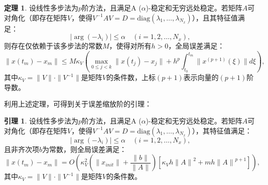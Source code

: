 \documentclass{article}
\theoremstyle{definition}
\newtheorem{theorem}{定理}
\newtheorem{lemma}{引理}
\begin{document}
\begin{theorem}
设线性多步法为\(p\)阶方法，且满足A (\(\alpha \))-稳定和无穷远处稳定。若矩阵\(A\)可对角化（即存在矩阵\(V\)，使得\(V^{-1} A V = D = \text{diag}(\lambda_1, \dots, \lambda_{N_x})\)），且其特征值满足：
\[
|\arg(-\lambda_i)| \leq \alpha\quad (i=1,2,\dots,N_x), 
\]
则存在仅依赖于该多步法的常数\(M\)，使得对所有\(h > 0\)，全局误差满足：
\[
\|x(t_m) - x_m\| \leq M \kappa_V \left( \max_{0 \leq j < k} \|x(t_j) - x_j\| + h^p \int_{t_0}^{t_m} \|x^{(p+1)}(\xi)\| d\xi \right),
\]
其中\(\kappa_V = \|V\| \cdot \|V^{-1}\|\)是矩阵\(V\)的条件数，上标\((p+1)\)表示向量的\((p+1)\)阶导数。
\end{theorem}

利用上述定理，可得到关于误差缩放阶的引理：

\begin{lemma}
设线性多步法为\(p\)阶方法，且满足A (\(\alpha \))-稳定和无穷远处稳定。若矩阵\(A\)可对角化（即存在矩阵\(V\)，使得\(V^{-1} A V = D = \text{diag}(\lambda_1, \dots, \lambda_{N_x})\)），其特征值满足：
\[
|\arg(-\lambda_i)| \leq \alpha\quad (i=1,2,\dots,N_x),
\]
且非齐次项\(b\)为常数，则全局误差满足：
\[
\|x(t_m) - x_m\| = O\left( \kappa_V^2 \left( \|x_{init}\| + \frac{\|b\|}{\|A\|} 
\right) \left[ \kappa_V {h\|A\|}^2 + m {h\|A\|}^{p+1} \right] \right), 
\]
其中\(\kappa_V = \|V\| \cdot \|V^{-1}\|\)是矩阵\(V\)的条件数。
\end{lemma}
\end{document}
